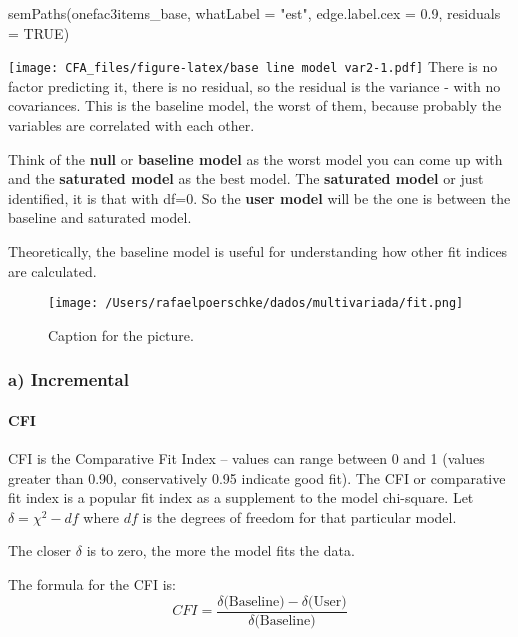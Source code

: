 \documentclass[
]{article}
\newenvironment{Shaded}{\begin{snugshade}}{\end{snugshade}}
\newcommand{\AttributeTok}[1]{\textcolor[rgb]{0.77,0.63,0.00}{#1}}
\newcommand{\ConstantTok}[1]{\textcolor[rgb]{0.00,0.00,0.00}{#1}}
\newcommand{\FloatTok}[1]{\textcolor[rgb]{0.00,0.00,0.81}{#1}}
\newcommand{\FunctionTok}[1]{\textcolor[rgb]{0.00,0.00,0.00}{#1}}
\newcommand{\NormalTok}[1]{#1}
\newcommand{\StringTok}[1]{\textcolor[rgb]{0.31,0.60,0.02}{#1}}
\begin{document}
\begin{Shaded}
\begin{Highlighting}[]
\FunctionTok{semPaths}\NormalTok{(onefac3items\_base, }\AttributeTok{whatLabel =} \StringTok{"est"}\NormalTok{, }\AttributeTok{edge.label.cex =} \FloatTok{0.9}\NormalTok{, }\AttributeTok{residuals =} \ConstantTok{TRUE}\NormalTok{) }
\end{Highlighting}
\end{Shaded}

\texttt{[image: CFA\_files/figure-latex/base line model var2-1.pdf]}
There is no factor predicting it, there is no residual, so the residual
is the variance - with no covariances. This is the baseline model, the
worst of them, because probably the variables are correlated with each
other.

Think of the \textbf{null} or \textbf{baseline model} as the worst model
you can come up with and the \textbf{saturated model} as the best model.
The \textbf{saturated model} or just identified, it is that with df=0.
So the \textbf{user model} will be the one is between the baseline and
saturated model.

Theoretically, the baseline model is useful for understanding how other
fit indices are calculated.

\begin{figure}
\centering
\texttt{[image: /Users/rafaelpoerschke/dados/multivariada/fit.png]}
\caption{Caption for the picture.}
\end{figure}

\hypertarget{a-incremental}{%
\subsubsection{a) Incremental}\label{a-incremental}}

\hypertarget{cfi}{%
\paragraph{CFI}\label{cfi}}

CFI is the Comparative Fit Index -- values can range between 0 and 1
(values greater than 0.90, conservatively 0.95 indicate good fit). The
CFI or comparative fit index is a popular fit index as a supplement to
the model chi-square. Let \(\delta=\chi^{2}-df\) where \(df\) is the
degrees of freedom for that particular model.

The closer \(\delta\) is to zero, the more the model fits the data.

The formula for the CFI is: \[
CFI = \frac{\delta \text{(Baseline)}-\delta \text{(User)}}{\delta \text{(Baseline)}}
\]
\end{document}
